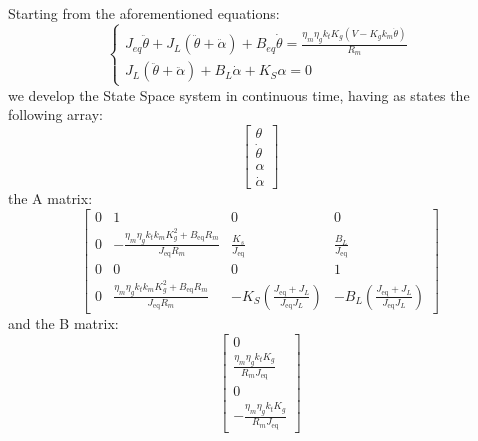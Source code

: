                 Starting from the aforementioned equations:
                \begin{equation*}
                    \begin{cases}
                        J_{eq}\ddot\theta+J_{L}(\ddot\theta+\ddot\alpha) + B_{eq}\dot\theta=\frac{\eta_m\eta_g k_t K_g(V - K_g k_m\dot\theta)}{R_m} \\
                        J_{L}(\ddot\theta+\ddot\alpha)+B_L\dot\alpha +K_{S}\alpha=0
                    \end{cases}
                \end{equation*}
                we develop the State Space system in continuous time, having as states the following array:
                \[
                    \left\lbrack \begin{array}{c}
                        \theta \\
                        \dot{\theta} \\
                        \alpha \\
                        \dot{\alpha} 
                        \end{array}\right\rbrack\]
                the A matrix:
                \begin{equation*}
                    \left\lbrack \begin{array}{cccc}
                        0 & 1 & 0 & 0\\
                        0 & -\frac{\eta_m \eta_g k_t k_m K_g^2 +B_{\mathrm{eq}} R_m }{J_{\mathrm{eq}} R_m } & \frac{K_s }{J_{\mathrm{eq}} } & \frac{B_L }{J_{\mathrm{eq}} }\\
                        0 & 0 & 0 & 1\\
                        0 & \frac{\eta_m \eta_g k_t k_m K_g^2 +B_{\mathrm{eq}} R_m }{J_{\mathrm{eq}} R_m } & -K_S \left(\frac{J_{\mathrm{eq}} +J_{L} }{J_{\mathrm{eq}} J_{L} }\right) & -B_L \left(\frac{J_{\mathrm{eq}} +J_{L} }{J_{\mathrm{eq}} J_{L} }\right)
                        \end{array}\right\rbrack 
                \end{equation*}
                and the B matrix:
                \begin{equation*}
                    \left\lbrack \begin{array}{c}
                        0\\
                        \frac{\eta_m \eta_g k_t K_g }{R_m J_{\mathrm{eq}} }\\
                        0\\
                        -\frac{\eta_m \eta_g k_t K_g }{R_m J_{\mathrm{eq}} }
                        \end{array}\right\rbrack
                \end{equation*}

